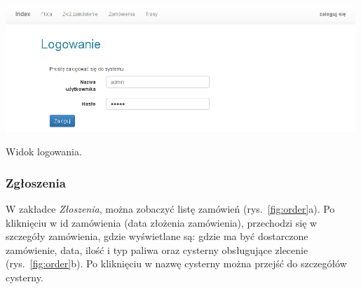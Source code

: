 \documentclass[11pt,a4paper,oneside]{mwart}
\begin{document}
\begin{wykres}[htbp]
  \centering
  \includegraphics[width=0.99\textwidth]{pics/login.png}
  \caption{Widok logowania.}
  \label{fig:login}
\end{wykres}


\subsubsection{Zgłoszenia}
W zakładce \emph{Złoszenia}, można zobaczyć listę zamówień (rys.~\ref{fig:order}a). Po kliknięciu w id zamówienia (data złożenia zamówienia), przechodzi się w szczegóły zamówienia, gdzie wyświetlane są: gdzie ma być dostarczone zamówienie, data, ilość i typ paliwa oraz cysterny obsługujące zlecenie (rys.~\ref{fig:order}b). Po kliknięciu w nazwę cysterny można przejść do szczegółów cysterny.
\end{document}
